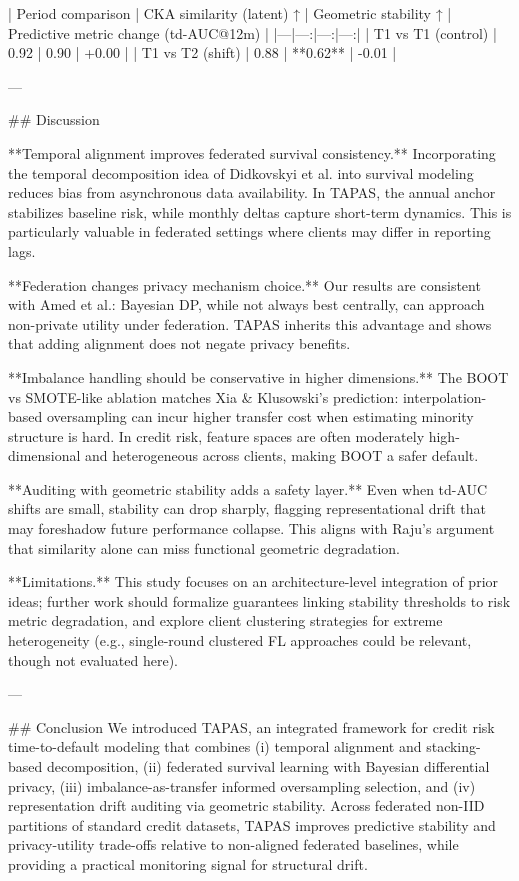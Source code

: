 | Period comparison | CKA similarity (latent) ↑ | Geometric stability ↑ | Predictive metric change (td-AUC@12m) |
|---|---:|---:|---:|
| T1 vs T1 (control) | 0.92 | 0.90 | +0.00 |
| T1 vs T2 (shift) | 0.88 | **0.62** | -0.01 |

---

## Discussion  

**Temporal alignment improves federated survival consistency.** Incorporating the temporal decomposition idea of Didkovskyi et al. into survival modeling reduces bias from asynchronous data availability. In TAPAS, the annual anchor stabilizes baseline risk, while monthly deltas capture short-term dynamics. This is particularly valuable in federated settings where clients may differ in reporting lags.

**Federation changes privacy mechanism choice.** Our results are consistent with Amed et al.: Bayesian DP, while not always best centrally, can approach non-private utility under federation. TAPAS inherits this advantage and shows that adding alignment does not negate privacy benefits.

**Imbalance handling should be conservative in higher dimensions.** The BOOT vs SMOTE-like ablation matches Xia & Klusowski’s prediction: interpolation-based oversampling can incur higher transfer cost when estimating minority structure is hard. In credit risk, feature spaces are often moderately high-dimensional and heterogeneous across clients, making BOOT a safer default.

**Auditing with geometric stability adds a safety layer.** Even when td-AUC shifts are small, stability can drop sharply, flagging representational drift that may foreshadow future performance collapse. This aligns with Raju’s argument that similarity alone can miss functional geometric degradation.

**Limitations.** This study focuses on an architecture-level integration of prior ideas; further work should formalize guarantees linking stability thresholds to risk metric degradation, and explore client clustering strategies for extreme heterogeneity (e.g., single-round clustered FL approaches could be relevant, though not evaluated here).

---

## Conclusion  
We introduced TAPAS, an integrated framework for credit risk time-to-default modeling that combines (i) temporal alignment and stacking-based decomposition, (ii) federated survival learning with Bayesian differential privacy, (iii) imbalance-as-transfer informed oversampling selection, and (iv) representation drift auditing via geometric stability. Across federated non-IID partitions of standard credit datasets, TAPAS improves predictive stability and privacy-utility trade-offs relative to non-aligned federated baselines, while providing a practical monitoring signal for structural drift.

